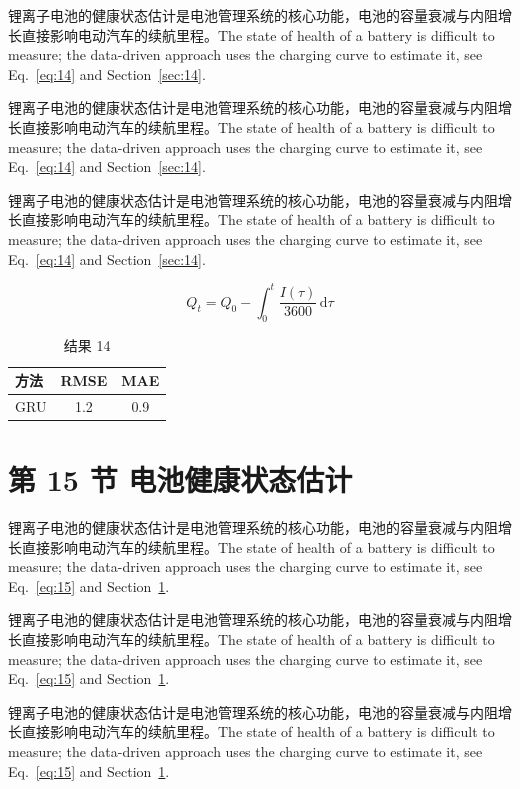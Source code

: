 \documentclass[UTF8,fontset=mac]{ctexart}
\begin{document}
锂离子电池的健康状态估计是电池管理系统的核心功能，电池的容量衰减与内阻增长直接影响电动汽车的续航里程\cite{a2020}。The state of health of a battery is difficult to measure; the data-driven approach uses the charging curve to estimate it, see Eq.~\eqref{eq:14} and Section~\ref{sec:14}.

锂离子电池的健康状态估计是电池管理系统的核心功能，电池的容量衰减与内阻增长直接影响电动汽车的续航里程\cite{a2020}。The state of health of a battery is difficult to measure; the data-driven approach uses the charging curve to estimate it, see Eq.~\eqref{eq:14} and Section~\ref{sec:14}.

锂离子电池的健康状态估计是电池管理系统的核心功能，电池的容量衰减与内阻增长直接影响电动汽车的续航里程\cite{a2020}。The state of health of a battery is difficult to measure; the data-driven approach uses the charging curve to estimate it, see Eq.~\eqref{eq:14} and Section~\ref{sec:14}.

\begin{equation}\label{eq:14}
  Q_t = Q_0 - \int_0^t \frac{I(\tau)}{3600}\,\mathrm{d}\tau
\end{equation}
\begin{table}[h]\centering\begin{tabular}{lcc}\toprule 方法 & RMSE & MAE\\\midrule GRU & 1.2 & 0.9\\\bottomrule\end{tabular}\caption{结果 14}\end{table}

\section{第 15 节 电池健康状态估计}\label{sec:15}
锂离子电池的健康状态估计是电池管理系统的核心功能，电池的容量衰减与内阻增长直接影响电动汽车的续航里程\cite{a2020}。The state of health of a battery is difficult to measure; the data-driven approach uses the charging curve to estimate it, see Eq.~\eqref{eq:15} and Section~\ref{sec:15}.

锂离子电池的健康状态估计是电池管理系统的核心功能，电池的容量衰减与内阻增长直接影响电动汽车的续航里程\cite{a2020}。The state of health of a battery is difficult to measure; the data-driven approach uses the charging curve to estimate it, see Eq.~\eqref{eq:15} and Section~\ref{sec:15}.

锂离子电池的健康状态估计是电池管理系统的核心功能，电池的容量衰减与内阻增长直接影响电动汽车的续航里程\cite{a2020}。The state of health of a battery is difficult to measure; the data-driven approach uses the charging curve to estimate it, see Eq.~\eqref{eq:15} and Section~\ref{sec:15}.
\end{document}
